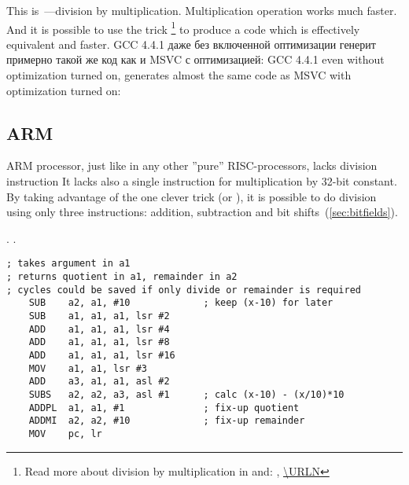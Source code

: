 {This is~---division by multiplication. Multiplication operation works much faster. 
And it is possible to use the trick
\footnote{Read more about division by multiplication in \cite[10-3]{Warren:2002:HD:515297}
and: \URLMSDN, \url{\URLN}} 
to produce a code which is effectively equivalent and faster.}
\IFRU
{GCC 4.4.1 даже без включенной оптимизации генерит примерно такой же код как и MSVC с оптимизацией:}
{GCC 4.4.1 even without optimization turned on, generates almost the same code as MSVC with optimization turned on:}



\subsection{ARM}

{ARM processor, just like in any other ''pure'' RISC-processors, lacks division instruction
It lacks also a single instruction for multiplication by 32-bit constant.}
{By taking advantage of the one clever trick (or ), it is possible to do division using only three instructions: addition,
subtraction and bit shifts}~(\ref{sec:bitfields}).

\cite[3.3 Division by a Constant]{ARM:1994}.
.

\begin{lstlisting}
; takes argument in a1
; returns quotient in a1, remainder in a2
; cycles could be saved if only divide or remainder is required
    SUB    a2, a1, #10             ; keep (x-10) for later
    SUB    a1, a1, a1, lsr #2
    ADD    a1, a1, a1, lsr #4
    ADD    a1, a1, a1, lsr #8
    ADD    a1, a1, a1, lsr #16
    MOV    a1, a1, lsr #3
    ADD    a3, a1, a1, asl #2
    SUBS   a2, a2, a3, asl #1      ; calc (x-10) - (x/10)*10
    ADDPL  a1, a1, #1              ; fix-up quotient
    ADDMI  a2, a2, #10             ; fix-up remainder
    MOV    pc, lr
\end{lstlisting}

